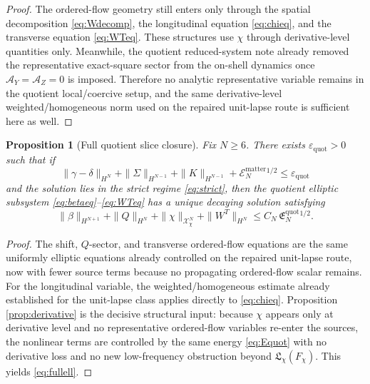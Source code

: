\documentclass[11pt]{article}
\newtheorem{proposition}{Proposition}
\begin{document}
\begin{proof}
The ordered-flow geometry still enters only through the spatial decomposition \eqref{eq:Wdecomp}, the longitudinal equation \eqref{eq:chieq}, and the transverse equation \eqref{eq:WTeq}. These structures use \(\chi\) through derivative-level quantities only. Meanwhile, the quotient reduced-system note already removed the representative exact-square sector from the on-shell dynamics once \(\mathcal A_Y=\mathcal A_Z=0\) is imposed. Therefore no analytic representative variable remains in the quotient local/coercive setup, and the same derivative-level weighted/homogeneous norm used on the repaired unit-lapse route is sufficient here as well.
\end{proof}

\begin{proposition}[Full quotient slice closure]
\label{prop:fullell}
Fix \(N\ge 6\). There exists \(\varepsilon_{\mathrm{quot}}>0\) such that if
\begin{equation}
\|\gamma-\delta\|_{H^N}
+\|\Sigma\|_{H^{N-1}}
+\|K\|_{H^{N-1}}
+\mathcal E_N^{\mathrm{matter}}{}^{1/2}
\le
\varepsilon_{\mathrm{quot}}
\label{eq:small}
\end{equation}
and the solution lies in the strict regime \eqref{eq:strict}, then the quotient elliptic subsystem \eqref{eq:betaeq}--\eqref{eq:WTeq} has a unique decaying solution satisfying
\begin{equation}
\|\beta\|_{H^{N+1}}
+\|Q\|_{H^N}
+\|\chi\|_{\mathcal X_\chi^N}
+\|W^T\|_{H^N}
\le
C_N\,\mathfrak E_N^{\mathrm{quot}}{}^{1/2}.
\label{eq:fullell}
\end{equation}
\end{proposition}

\begin{proof}
The shift, \(Q\)-sector, and transverse ordered-flow equations are the same uniformly elliptic equations already controlled on the repaired unit-lapse route, now with fewer source terms because no propagating ordered-flow scalar remains. For the longitudinal variable, the weighted/homogeneous estimate already established for the unit-lapse class applies directly to \eqref{eq:chieq}. Proposition \ref{prop:derivative} is the decisive structural input: because \(\chi\) appears only at derivative level and no representative ordered-flow variables re-enter the sources, the nonlinear terms are controlled by the same energy \eqref{eq:Equot} with no derivative loss and no new low-frequency obstruction beyond \(\mathfrak L_\chi(F_\chi)\). This yields \eqref{eq:fullell}.
\end{proof}
\end{document}
